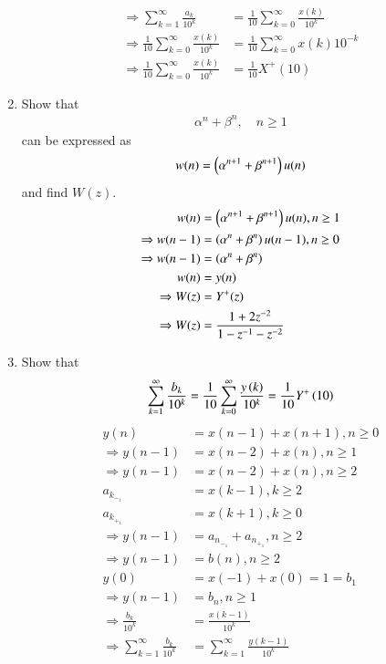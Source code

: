 \documentclass[journal,12pt,twocolumn]{IEEEtran}
\renewcommand\thesection{\arabic{section}}
\begin{document}
\begin{enumerate}[label=\thesection.\arabic*,ref=\thesection.\theenumi]
\begin{align}
	\Rightarrow \sum_{k=1}^{\infty}\frac{a_k}{10^{k}}&=\frac{1}{10}\sum_{k=0}^{\infty}\frac{x(k)}{10^{k}}\\
	\Rightarrow \frac{1}{10}\sum_{k=0}^{\infty}\frac{x(k)}{10^{k}}&=\frac{1}{10}\sum_{k=0}^{\infty}x(k)10^{-k}\\
	\Rightarrow \frac{1}{10}\sum_{k=0}^{\infty}\frac{x(k)}{10^{k}}&=\frac{1}{10}X^{+}(10)
\end{align}
 \item Show that 
\begin{align}
	\alpha^n + \beta^n, \quad n \ge 1
\end{align}
can be expressed as 
\begin{align}
	w(n) =\left(\alpha^{n+1} + \beta^{n+1}\right)u(n)
\end{align}
		and find $W(z)$.\\
		\solution
	\begin{align}
		w(n) &=\left(\alpha^{n+1} + \beta^{n+1}\right)u(n),n\ge 1\\
	\Rightarrow	w(n-1) &=\left(\alpha^{n} + \beta^{n}\right)u(n-1),n\ge 0\\
	\Rightarrow	w(n-1) &=\left(\alpha^{n} + \beta^{n}\right)\\
		w(n)&=y(n)\\
		\Rightarrow W(z)&=Y^{+}(z)\\
		\Rightarrow W(z)&=\frac{1+2z^{-2}}{1-z^{-1}-z^{-2}}
	\end{align}
 \item Show that 
\begin{align}
	\sum_{k=1}^{\infty}\frac{b_k}{10^k} =
	\frac{1}{10}\sum_{k=0}^{\infty}\frac{y\left(k\right)}{10^k} =\frac{1}{10}Y^{+}\left({10}\right)
\end{align}
\solution
\begin{align}
	y(n)&=x(n-1)+x(n+1),n \ge 0\\
	\Rightarrow y(n-1)&=x(n-2)+x(n),n \ge 1\\
	\Rightarrow y(n-1)&=x(n-2)+x(n),n \ge 2\\
    a_k_-_1&=x(k-1),k\ge 2\\
	a_k_+_1&=x(k+1),k \ge 0\\
	\Rightarrow y(n-1)&=a_n_-_1+a_n_+_1,n \ge 2\\
	\Rightarrow y(n-1)&=b(n),n \ge 2\\
	y(0)&=x(-1)+x(0)=1=b_1\\
	\Rightarrow y(n-1)&=b_n,n \ge 1\\
	\Rightarrow \frac{b_k}{10^{k}}&=\frac{x(k-1)}{10^{k}}\\
	\Rightarrow \sum_{k=1}^{\infty}\frac{b_k}{10^{k}}&=\sum_{k=1}^{\infty}\frac{y(k-1)}{10^{k}}\\

\end{align}
\end{enumerate}
\end{document}
